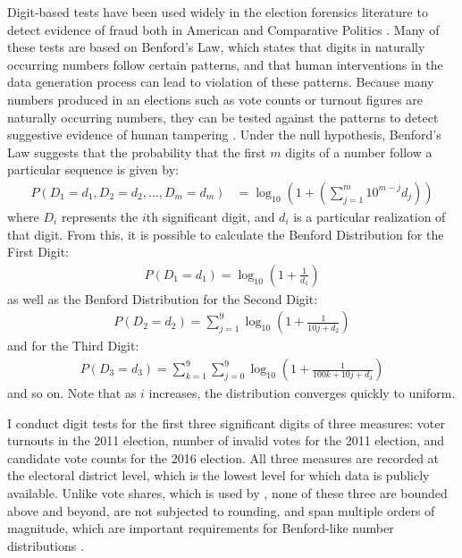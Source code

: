 \documentclass[12pt]{article}
\newcommand{\1}{\mathbbm{1}}
\renewcommand\r{\right}
\renewcommand\l{\left}
\begin{document}
Digit-based tests have been used widely in the election forensics literature to detect evidence of fraud both in American \citep{Mebane2006} and Comparative Politics \citep{Mebane2009, Beber2012}. Many of these tests are based on Benford's Law, which states that digits in naturally occurring numbers follow certain patterns, and that human interventions in the data generation process can lead to violation of these patterns. Because many numbers produced in an elections such as vote counts or turnout figures are naturally occurring numbers, they can be tested against the patterns to detect suggestive evidence of human tampering \citep{Mebane2006}. Under the null hypothesis, Benford's Law suggests that the probability that the first $m$ digits of a number follow a particular sequence is given by:
\begin{align*}
P(D_1=d_1, D_2=d_2, \dots, D_m=d_m) &= \log_{10}\l(1 + \l( \sum_{j=1}^{m}10^{m-j}d_j\r)\r)
\end{align*}
where $D_i$ represents the $i$th significant digit, and $d_i$ is a particular realization of that digit. From this, it is possible to calculate the Benford Distribution for the First Digit:
\begin{align*}
	P(D_1=d_1) = \log_{10}\l(1 + \frac{1}{d_1}\r)
\end{align*}
as well as the Benford Distribution for the Second Digit:
\begin{align*}
	P(D_2=d_2) = \sum_{j=1}^{9}\log_{10}\l(1 + \frac{1}{10j + d_2}\r)
\end{align*}
and for the Third Digit:
\begin{align*}
	P(D_3=d_3) = \sum_{k=1}^{9}\sum_{j=0}^{9}\log_{10}\l(1 + \frac{1}{100k + 10j + d_3}\r)
\end{align*}
and so on. Note that as $i$ increases, the distribution converges quickly to uniform.

I conduct digit tests for the first three significant digits of three measures: voter turnouts in the 2011 election, number of invalid votes for the 2011 election, and candidate vote counts for the 2016 election. All three measures are recorded at the electoral district level, which is the lowest level for which data is publicly available. Unlike vote shares, which is used by \citep{MaleskySchuler2011}, none of these three are bounded above and beyond, are not subjected to rounding, and span multiple orders of magnitude, which are important requirements for Benford-like number distributions \citep{Hill1995, Mebane2006, Berger2015}.
\end{document}
